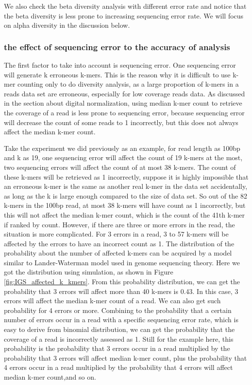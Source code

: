 We also check the beta diversity analysis with different error rate and notice
that the beta diversity is less prone to increasing sequencing error rate. We 
will focus on alpha diversity in the discussion below.

\subsubsection{the effect of sequencing error to the accuracy of analysis}
The first factor to take into account is sequencing error. One sequencing error
will generate k erroneous k-mers. This is the reason why it is difficult to use
k-mer counting only to do diversity analysis, as a large proportion of k-mers
in a reads data set are erroneous, especially for low coverage reads data. As
discussed in the section about digital normalization, using median k-mer count
to retrieve the coverage of a read is less prone to sequencing error, because
sequencing error will decrease the count of some reads to 1 incorrectly, but
this does not always affect the median k-mer count. 

Take the experiment we did
previously as an example, for read length as 100bp and k as 19, one sequencing
error will affect the count of 19 k-mers at the most, two sequencing errors
will affect the count of at most 38 k-mers. The count of these k-mers will be
retrieved as 1 incorrectly, suppose it is highly impossible that an erroneous
k-mer is the same as another real k-mer in the data set accidentally, as long as
the k is large enough compared to the size of data set. So out of the 82 k-mers
in the 100bp read, at most 38 k-mers will have count as 1 incorrectly, but this
will not affect the median k-mer count, which is the count of the 41th k-mer if
ranked by count. However, if there are three or more errors in the read, the 
situation is more complicated. For 3 errors in a read, 3 to 57 k-mers
will be affected by the errors to have an incorrect count as 1. The 
distribution of the probability about the number of affected k-mers can be
acquired by a model similar to Lander-Waterman model used in genome sequencing
 theory. Here we got the distribution using simulation, as shown in Figure
\ref{fig:IGS_affected_k_kmers}. From this probability distribution, we can get
the probability that 3 errors will affect more than 40 k-mers is 0.43. In this
case, 3 errors will affect the median k-mer count of a read. We can also get 
such probability for 4 errors or more. Combining to the probability that a
certain number of errors occur in a read with a specific sequencing error rate,
which is easy to derive from binomial distribution, we can get the probability
that the coverage of a read is incorrectly assessed as 1. Still for the example
here, this probability is the probability that 3 errors occur in a read
multiplied by the probability that 3 errors will affect median k-mer count,
plus the probability that 4 errors occur in a read multiplied by the 
probability that 4 errors will affect median k-mer count,and so on.

